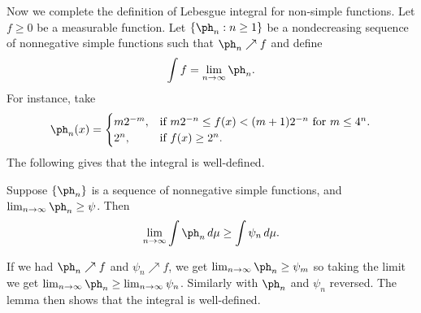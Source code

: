 Now we complete the definition of Lebesgue integral for non-simple functions. Let $f\geq 0$ be a measurable function. Let $\{\ph_n:n\geq 1\}$ be a nondecreasing sequence of nonnegative simple functions such that $\ph_n\nearrow f$ and define
\[
\int f=\lim_{n\to \infty} \ph_n.
\]
For instance, take 
\[
\ph_n(x)=\begin{cases}
m2^{-m},&\text{if }m2^{-n}\leq f(x)<(m+1)2^{-n}\text{ for }m\leq 4^n.\\
2^n,&\text{if }f(x)\geq 2^n.
\end{cases}
\]
The following gives that the integral is well-defined.
\begin{lem}\label{extendintwelldef}
Suppose $\{\ph_n\}$ is a sequence of nonnegative simple functions, and $\lim_{n\to \infty }\ph_n\geq \psi$. Then 
\[
\lim_{n\to \infty}\int \ph_n\,d\mu \geq \int \psi_n\,d\mu.
\]
\end{lem}
If we had $\ph_n\nearrow f$ and $\psi_n\nearrow f$, we get $\lim_{n\to \infty} \ph_n\geq \psi_m$ so taking the limit we get $\lim_{n\to \infty} \ph_n\geq \lim_{n\to \infty}\psi_n$. Similarly with $\ph_n$ and $\psi_n$ reversed.  The lemma then shows that the integral is well-defined.
